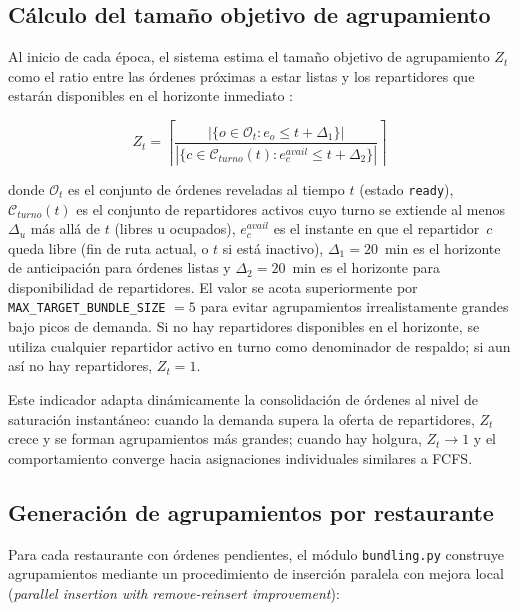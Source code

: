 \documentclass[12pt,letterpaper,oneside]{book}
\begin{document}
	\subsection{Cálculo del tamaño objetivo de agrupamiento}

	Al inicio de cada época, el sistema estima el tamaño objetivo de agrupamiento $Z_t$ como 
	el ratio entre las órdenes próximas a estar listas y los repartidores que estarán disponibles 
	en el horizonte inmediato \citep{Reyes2018}:

	\begin{equation}
		Z_t = \left\lceil \frac{|\{o \in \mathcal{O}_t : e_o \leq t + \Delta_1\}|}
		{|\{c \in \mathcal{C}_{turno}(t) : e^{avail}_c \leq t + \Delta_2\}|} \right\rceil
		\label{eq:target_bundle}
	\end{equation}

	\noindent donde $\mathcal{O}_t$ es el conjunto de órdenes reveladas al tiempo $t$ 
	(estado \texttt{ready}), $\mathcal{C}_{turno}(t)$ es el conjunto de repartidores activos cuyo
	turno se extiende al menos $\Delta_u$ más allá de $t$ (libres u ocupados),
	$e^{avail}_c$ es el instante en que el repartidor~$c$ queda
	libre (fin de ruta actual, o $t$ si está inactivo),
	$\Delta_1 = 20$~min es el horizonte de anticipación para órdenes listas 
	y $\Delta_2 = 20$~min es el horizonte para disponibilidad de repartidores. El valor se acota 
	superiormente por \texttt{MAX\_TARGET\_BUNDLE\_SIZE} $= 5$ para evitar agrupamientos 
	irrealistamente grandes bajo picos de demanda. Si no hay repartidores disponibles en el 
	horizonte, se utiliza cualquier repartidor activo en turno como denominador de respaldo; si 
	aun así no hay repartidores, $Z_t = 1$.

	Este indicador adapta dinámicamente la consolidación de órdenes al nivel de saturación 
	instantáneo: cuando la demanda supera la oferta de repartidores, $Z_t$ crece y se forman 
	agrupamientos más grandes; cuando hay holgura, $Z_t \to 1$ y el comportamiento converge 
	hacia asignaciones individuales similares a FCFS.

	\subsection{Generación de agrupamientos por restaurante}

	Para cada restaurante con órdenes pendientes, el módulo \texttt{bundling.py} construye
	agrupamientos mediante un procedimiento de inserción paralela con mejora local
	(\textit{parallel insertion with remove-reinsert improvement}):
\end{document}
